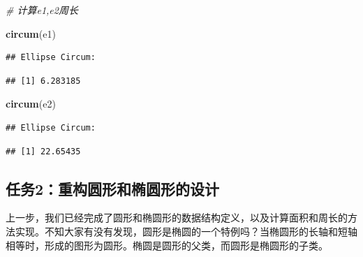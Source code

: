 \documentclass[]{book}
\newenvironment{Shaded}{\begin{snugshade}}{\end{snugshade}}
\newcommand{\KeywordTok}[1]{\textcolor[rgb]{0.13,0.29,0.53}{\textbf{#1}}}
\newcommand{\CommentTok}[1]{\textcolor[rgb]{0.56,0.35,0.01}{\textit{#1}}}
\newcommand{\NormalTok}[1]{#1}
\begin{document}
\begin{Shaded}
\begin{Highlighting}[]
\CommentTok{# 计算e1,e2周长}

\KeywordTok{circum}\NormalTok{(e1)}
\end{Highlighting}
\end{Shaded}

\begin{verbatim}
## Ellipse Circum:
\end{verbatim}

\begin{verbatim}
## [1] 6.283185
\end{verbatim}

\begin{Shaded}
\begin{Highlighting}[]
\KeywordTok{circum}\NormalTok{(e2)}
\end{Highlighting}
\end{Shaded}

\begin{verbatim}
## Ellipse Circum:
\end{verbatim}

\begin{verbatim}
## [1] 22.65435
\end{verbatim}

\subsection{任务2：重构圆形和椭圆形的设计}\label{2}

上一步，我们已经完成了圆形和椭圆形的数据结构定义，以及计算面积和周长的方法实现。不知大家有没有发现，圆形是椭圆的一个特例吗？当椭圆形的长轴和短轴相等时，形成的图形为圆形。椭圆是圆形的父类，而圆形是椭圆形的子类。
\end{document}
